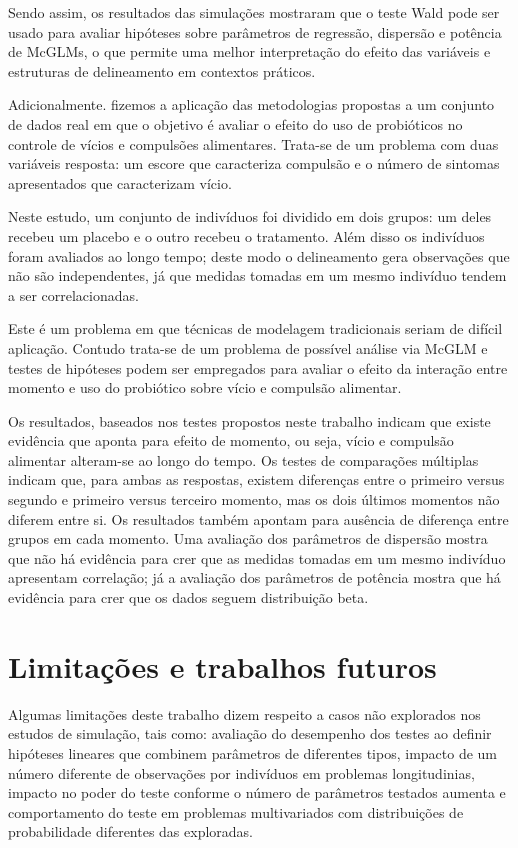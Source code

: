 Sendo assim, os resultados das simulações mostraram que o teste Wald pode ser usado para avaliar hipóteses sobre parâmetros de regressão, dispersão e potência de McGLMs, o que permite uma melhor interpretação do efeito das variáveis e estruturas de delineamento em contextos práticos.

Adicionalmente. fizemos a aplicação das metodologias propostas a um conjunto de dados real em que o objetivo é avaliar o efeito do uso de probióticos no controle de vícios e compulsões alimentares. Trata-se de um problema com duas variáveis resposta: um escore que caracteriza compulsão e o número de sintomas apresentados que caracterizam vício. 

Neste estudo, um conjunto de indivíduos foi dividido em dois grupos: um deles recebeu um placebo e o outro recebeu o tratamento. Além disso os indivíduos foram avaliados ao longo tempo; deste modo o delineamento gera observações que não são independentes, já que medidas tomadas em um mesmo indivíduo tendem a ser correlacionadas. 

Este é um problema em que técnicas de modelagem tradicionais seriam de difícil aplicação. Contudo trata-se de um problema de possível análise via McGLM e testes de hipóteses podem ser empregados para avaliar o efeito da interação entre momento e uso do probiótico sobre vício e compulsão alimentar.

Os resultados, baseados nos testes propostos neste trabalho indicam que existe evidência que aponta para efeito de momento, ou seja, vício e compulsão alimentar alteram-se ao longo do tempo. Os testes de comparações múltiplas indicam que, para ambas as respostas, existem diferenças entre o primeiro versus segundo e primeiro versus terceiro momento, mas os dois
últimos momentos não diferem entre si. Os resultados também apontam para ausência de diferença entre grupos em cada momento. Uma avaliação dos parâmetros de dispersão mostra que não há evidência para crer que as medidas tomadas em um mesmo indivíduo apresentam correlação; já a avaliação dos parâmetros de potência mostra que há evidência para crer que os dados seguem distribuição beta.


\section{Limitações e trabalhos futuros}

Algumas limitações deste trabalho dizem respeito a casos não explorados nos estudos de simulação, tais como: avaliação do desempenho dos testes ao definir hipóteses lineares que combinem parâmetros de diferentes tipos, impacto de um número diferente de observações por indivíduos em problemas longitudinias, impacto no poder do teste conforme o número de parâmetros testados aumenta e comportamento do teste em problemas multivariados com distribuições de probabilidade diferentes das exploradas.

